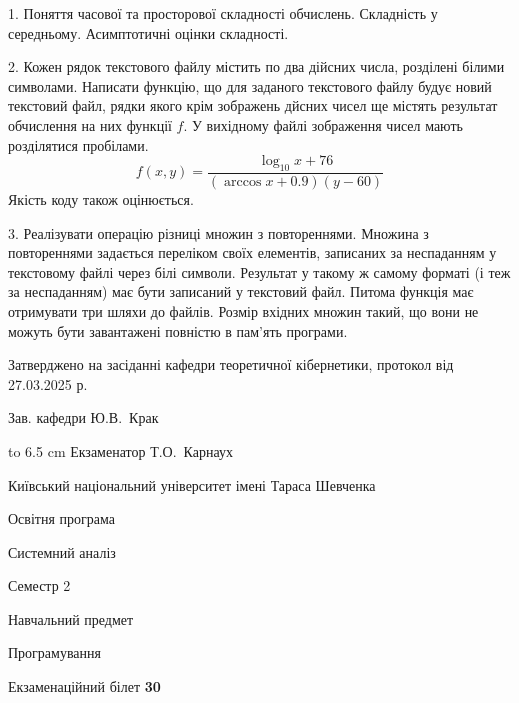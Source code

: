 \documentclass[12pt, ukrainian]{article}
\begin{document}
{%
1. Поняття часової та просторової складності обчислень. Складність у середньому. Асимптотичні оцінки складності.%
\par
\vspace{2mm}

2. Кожен рядок текстового файлу містить по два дійсних числа, розділені білими символами.
Написати функцію, що для заданого текстового файлу будує новий текстовий файл, рядки якого крім зображень дйсних чисел ще містять результат обчислення на них функції $f$. У вихідному файлі зображення чисел мають розділятися пробілами. 
$$f(x, y) =\frac{\log_{10} x + 76}{(\arccos x + 0.9) (y - 60)}$$ 
Якість коду також оцінюється.

\par
\vspace{2mm}

3. Реалізувати операцію різниці множин з повтореннями. Множина з повтореннями задається переліком своїх елементів, записаних за неспаданням у текстовому файлі через білі символи. Результат у такому ж самому форматі (і теж за неспаданням) має бути записаний у текстовий файл. Питома функція має отримувати три шляхи до файлів. Розмір вхідних множин такий, що вони не можуть бути завантажені повністю в пам’ять програми.

}
{\smallskip\smallskip \begin {scriptsize} Затверджено на засіданні кафедри теоретичної кібернетики, протокол   від   27.03.2025 р.\par\smallskip\smallskip\smallskip\smallskip
{\parbox {6.5 cm} {Зав. кафедри \dotfill Ю.В.~Крак}}\hspace {0.7cm} {\hbox to 6.5 cm { Екзаменатор \dotfill Т.О.~Карнаух}} \end{scriptsize}}
\vspace{2.9cm}
{{\begin {scriptsize}\par
{ \center  Київський національний університет імені Тараса Шевченка \par}
{\parbox {5 cm}{Освітня програма \hfill}{\parbox {7 cm}{Системний аналіз\hfill}}\parbox {6 cm}{\hfill Семестр 2}}\par
{\parbox {5 cm} {Навчальний предмет \hfill}\parbox {7 cm}{Програмування \hfill}\parbox {6cm}{\hfill}\par}\vspace{-15pt} \end{scriptsize}}{\center Екзаменаційний білет \No \textbf { 30 }\par}}
\end{document}
